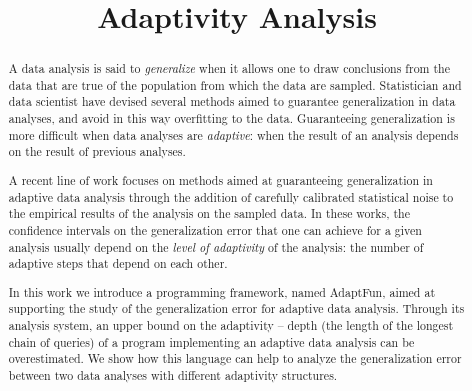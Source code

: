 \documentclass[a4paper,11pt]{article}
\newcommand{\THESYSTEM}{\textsf{AdaptFun}}
\begin{document}
\title{Adaptivity Analysis}

\author{}

\date{}

\maketitle

\begin{abstract}
  A data analysis is said to \emph{generalize} when it allows one to draw
  conclusions from the data that are true of the population from which
  the data are sampled. Statistician and data scientist have devised
  several methods aimed to guarantee generalization in  data
  analyses, and avoid in this way overfitting to the
  data. Guaranteeing generalization is more difficult when data
  analyses are \emph{adaptive}: when the result of an analysis depends
  on the result of previous analyses. 

  A recent line of work focuses on methods aimed at guaranteeing
  generalization in adaptive data analysis through the addition of
  carefully calibrated statistical noise to the empirical results of
  the analysis on the sampled data. In these works, the confidence
  intervals on the generalization error that one can achieve for a
  given analysis usually depend on the \emph{level of adaptivity} of
  the analysis: the number of adaptive steps that depend on
  each other. 

  In this work we introduce a programming framework, named \THESYSTEM,  aimed at
  supporting the study of the generalization error for adaptive data
  analysis. Through its analysis system, an upper bound on the
  adaptivity -- depth (the length of the longest chain of queries) of
  a program implementing an adaptive data analysis can be overestimated. We show how this language can help to analyze the generalization error between two data analyses with different adaptivity structures.
\end{abstract}

\tableofcontents


\end{document}
